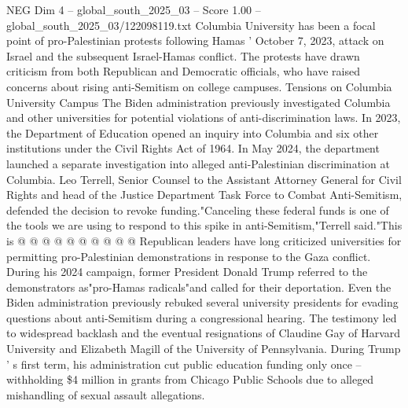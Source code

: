 \begin{textsample}{NEG Dim 4 – global\_south\_2025\_03 – Score 1.00 – global\_south\_2025\_03/122098119.txt}
Columbia University has been a focal point of pro-Palestinian protests following Hamas ' October 7, 2023, attack on Israel and the subsequent Israel-Hamas conflict.
The protests have drawn criticism from both Republican and Democratic officials, who have raised concerns about rising anti-Semitism on college campuses.
Tensions on Columbia University Campus The Biden administration previously investigated Columbia and other universities for potential violations of anti-discrimination laws.
In 2023, the Department of Education opened an inquiry into Columbia and six other institutions under the Civil Rights Act of 1964.
In May 2024, the department launched a separate investigation into alleged anti-Palestinian discrimination at Columbia.
Leo Terrell, Senior Counsel to the Assistant Attorney General for Civil Rights and head of the Justice Department Task Force to Combat Anti-Semitism, defended the decision to revoke funding."Canceling these federal funds is one of the tools we are using to respond to this spike in anti-Semitism,"Terrell said."This is @ @ @ @ @ @ @ @ @ @ Republican leaders have long criticized universities for permitting pro-Palestinian demonstrations in response to the Gaza conflict.
During his 2024 campaign, former President Donald Trump referred to the demonstrators as"pro-Hamas radicals"and called for their deportation.
Even the Biden administration previously rebuked several university presidents for evading questions about anti-Semitism during a congressional hearing.
The testimony led to widespread backlash and the eventual resignations of Claudine Gay of Harvard University and Elizabeth Magill of the University of Pennsylvania.
During Trump ' s first term, his administration cut public education funding only once -- withholding \$4 million in grants from Chicago Public Schools due to alleged mishandling of sexual assault allegations.

\end{textsample}
